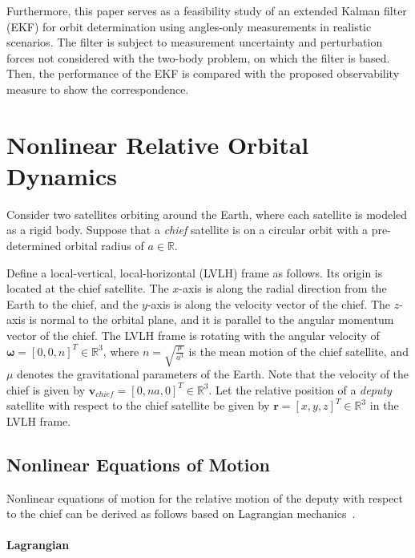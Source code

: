 \documentclass[letterpaper, paper,10pt]{AAS}		%
\renewcommand{\Re}{\ensuremath{\mathbb{R}}}
\begin{document}
Furthermore, this paper serves as a feasibility study of an extended Kalman filter (EKF) for orbit determination using angles-only measurements in realistic scenarios. The filter is subject to measurement uncertainty and perturbation forces not considered with the two-body problem, on which the filter is based.
Then, the performance of the EKF is compared with the proposed observability measure to show the correspondence. 




\section{Nonlinear Relative Orbital Dynamics}\label{sec:ND}

Consider two satellites orbiting around the Earth, where each satellite is modeled as a rigid body. Suppose that a \textit{chief} satellite is on a circular orbit with a pre-determined orbital radius of $a\in\Re$.

Define a local-vertical, local-horizontal (LVLH) frame as follows. Its origin is located at the chief satellite. The $x$-axis is along the radial direction from the Earth to the chief, and the $y$-axis is along the velocity vector of the chief. The $z$-axis is normal to the orbital plane, and it is parallel to the angular momentum vector of the chief. The LVLH frame is rotating with the angular velocity of $\mathbf{\omega}=[0,0,n]^T\in\Re^3$, where $n=\sqrt{\frac{\mu}{a^3}}$ is the mean motion of the chief satellite, and $\mu$ denotes the gravitational parameters of the Earth. Note that the velocity of the chief is given by $\mathbf{v}_{chief}=[0,na,0]^T\in\Re^3$. Let the relative position of a \textit{deputy} satellite with respect to the chief satellite be given by $\mathbf{r}=[x,y,z]^T\in\Re^3$ in the LVLH frame. 

\subsection{Nonlinear Equations of Motion}

Nonlinear equations of motion for the relative motion of the deputy with respect to the chief can be derived as follows based on Lagrangian mechanics~\cite{LovLeePISSFD14}. 

\paragraph{Lagrangian} 
\end{document}
